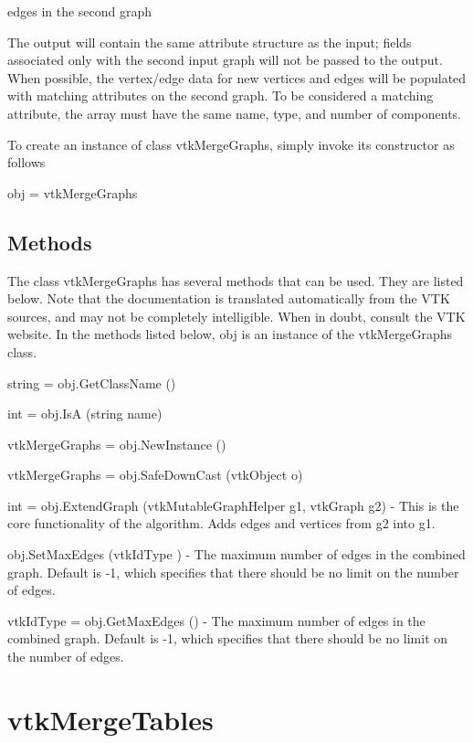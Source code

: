 \begin{DoxyItemize}
\item edges in the second graph
\end{DoxyItemize}

The output will contain the same attribute structure as the input; fields associated only with the second input graph will not be passed to the output. When possible, the vertex/edge data for new vertices and edges will be populated with matching attributes on the second graph. To be considered a matching attribute, the array must have the same name, type, and number of components.

To create an instance of class vtk\-Merge\-Graphs, simply invoke its constructor as follows \begin{DoxyVerb}  obj = vtkMergeGraphs
\end{DoxyVerb}
 \hypertarget{vtkwidgets_vtkxyplotwidget_Methods}{}\subsection{Methods}\label{vtkwidgets_vtkxyplotwidget_Methods}
The class vtk\-Merge\-Graphs has several methods that can be used. They are listed below. Note that the documentation is translated automatically from the V\-T\-K sources, and may not be completely intelligible. When in doubt, consult the V\-T\-K website. In the methods listed below, {\ttfamily obj} is an instance of the vtk\-Merge\-Graphs class. 
\begin{DoxyItemize}
\item {\ttfamily string = obj.\-Get\-Class\-Name ()}  
\item {\ttfamily int = obj.\-Is\-A (string name)}  
\item {\ttfamily vtk\-Merge\-Graphs = obj.\-New\-Instance ()}  
\item {\ttfamily vtk\-Merge\-Graphs = obj.\-Safe\-Down\-Cast (vtk\-Object o)}  
\item {\ttfamily int = obj.\-Extend\-Graph (vtk\-Mutable\-Graph\-Helper g1, vtk\-Graph g2)} -\/ This is the core functionality of the algorithm. Adds edges and vertices from g2 into g1.  
\item {\ttfamily obj.\-Set\-Max\-Edges (vtk\-Id\-Type )} -\/ The maximum number of edges in the combined graph. Default is -\/1, which specifies that there should be no limit on the number of edges.  
\item {\ttfamily vtk\-Id\-Type = obj.\-Get\-Max\-Edges ()} -\/ The maximum number of edges in the combined graph. Default is -\/1, which specifies that there should be no limit on the number of edges.  
\end{DoxyItemize}\hypertarget{vtkinfovis_vtkmergetables}{}\section{vtk\-Merge\-Tables}\label{vtkinfovis_vtkmergetables}
